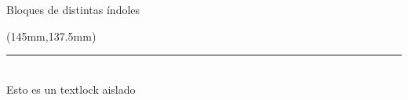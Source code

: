\begin{frame}[c]{Bloques de distintas índoles\footnotemark[1]}
    \begin{textblock*}{80mm}(145mm,137.5mm)
        \begin{flushleft}
        \scriptsize
        \rule{30mm}{.5pt}\\
        \footnotemark[1]
        Esto es un textlock aislado
    \end{flushleft}
     \end{textblock*}

\end{frame}
